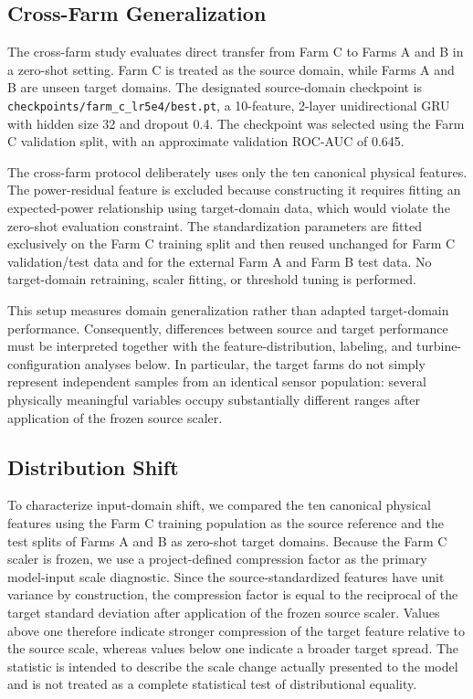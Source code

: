 \documentclass[conference]{IEEEtran}
\begin{document}
\subsection{Cross-Farm Generalization}

The cross-farm study evaluates direct transfer from Farm C to Farms A and B
in a zero-shot setting. Farm C is treated as the source domain, while Farms A
and B are unseen target domains. The designated source-domain checkpoint is
\texttt{checkpoints/farm\_c\_lr5e4/best.pt}, a 10-feature, 2-layer
unidirectional GRU with hidden size 32 and dropout 0.4. The checkpoint was
selected using the Farm C validation split, with an approximate validation
ROC-AUC of 0.645.

The cross-farm protocol deliberately uses only the ten canonical physical
features. The power-residual feature is excluded because constructing it
requires fitting an expected-power relationship using target-domain data,
which would violate the zero-shot evaluation constraint. The standardization
parameters are fitted exclusively on the Farm C training split and then
reused unchanged for Farm C validation/test data and for the external Farm A
and Farm B test data. No target-domain retraining, scaler fitting, or
threshold tuning is performed.

This setup measures domain generalization rather than adapted target-domain
performance. Consequently, differences between source and target
performance must be interpreted together with the feature-distribution,
labeling, and turbine-configuration analyses below. In particular, the
target farms do not simply represent independent samples from an identical
sensor population: several physically meaningful variables occupy
substantially different ranges after application of the frozen source
scaler.

\subsection{Distribution Shift}

To characterize input-domain shift, we compared the ten canonical physical
features using the Farm C training population as the source reference and the
test splits of Farms A and B as zero-shot target domains. Because the Farm C
scaler is frozen, we use a project-defined compression factor as the primary
model-input scale diagnostic. Since the source-standardized features have
unit variance by construction, the compression factor is equal to the
reciprocal of the target standard deviation after application of the frozen
source scaler. Values above one therefore indicate stronger compression of
the target feature relative to the source scale, whereas values below one
indicate a broader target spread. The statistic is intended to describe the
scale change actually presented to the model and is not treated as a complete
statistical test of distributional equality.
\end{document}
